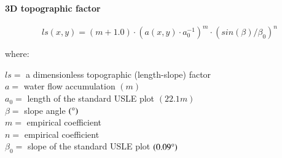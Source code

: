 \documentclass[final,3p,times,twocolumn]{elsarticle}
\begin{document}
\paragraph{3D topographic factor}


\begin{equation}
\label{eq:ls_factor}
{ls(x,y) = (m+1.0) \cdot (a(x,y) \cdot a_0^{-1})^{m} \cdot (sin(\beta) / \beta_0)^{n}}
\end{equation}

\noindent
where: 


\noindent
$ls =$ a dimensionless topographic (length-slope) factor\\
$a =$ water flow accumulation $(m)$\\
$a_0 =$ length of the standard USLE plot $(22.1 m)$\\
$\beta =$ slope angle $(\degree)$\\
$m =$ empirical coefficient\\
$n =$ empirical coefficient\\
$\beta_0 =$ slope of the standard USLE plot $(0.09 \degree)$\\
\vspace{1em}
%
\cite{Mitasova1995} %

%
%
\end{document}
